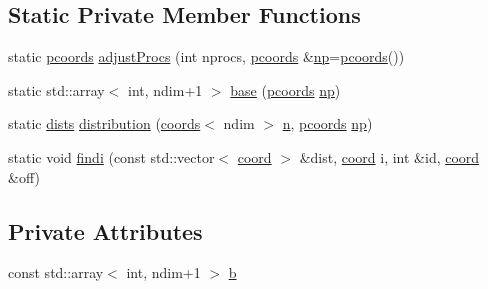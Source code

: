 \subsection*{Static Private Member Functions}
\begin{DoxyCompactItemize}
\item 
static \hyperlink{classshark_1_1ndim_1_1_domain_a9684ccd8af33cff7639c782290ac37ee}{pcoords} \hyperlink{classshark_1_1ndim_1_1_domain_a6d8aabbf8423bae3e392a4a87caf2185}{adjust\+Procs} (int nprocs, \hyperlink{classshark_1_1ndim_1_1_domain_a9684ccd8af33cff7639c782290ac37ee}{pcoords} \&\hyperlink{classshark_1_1ndim_1_1_domain_a1d15ab99cb54dcc456c5bba8699bcddf}{np}=\hyperlink{classshark_1_1ndim_1_1_domain_a9684ccd8af33cff7639c782290ac37ee}{pcoords}())
\item 
static std\+::array$<$ int, ndim+1 $>$ \hyperlink{classshark_1_1ndim_1_1_domain_a9335637df58667fdf13f6f861281c973}{base} (\hyperlink{classshark_1_1ndim_1_1_domain_a9684ccd8af33cff7639c782290ac37ee}{pcoords} \hyperlink{classshark_1_1ndim_1_1_domain_a1d15ab99cb54dcc456c5bba8699bcddf}{np})
\item 
static \hyperlink{classshark_1_1ndim_1_1_domain_a8d425ae958ccde33494fe1346307e991}{dists} \hyperlink{classshark_1_1ndim_1_1_domain_ad9cdf348ad0d1c8fe06965b3e9b3a5d0}{distribution} (\hyperlink{structshark_1_1ndim_1_1coords}{coords}$<$ ndim $>$ \hyperlink{classshark_1_1ndim_1_1_domain_ab942ffcf99c5ee0f2589c8b9104abcfd}{n}, \hyperlink{classshark_1_1ndim_1_1_domain_a9684ccd8af33cff7639c782290ac37ee}{pcoords} \hyperlink{classshark_1_1ndim_1_1_domain_a1d15ab99cb54dcc456c5bba8699bcddf}{np})
\item 
static void \hyperlink{classshark_1_1ndim_1_1_domain_a54d58b320fe6d558735b60753f30f7f4}{findi} (const std\+::vector$<$ \hyperlink{namespaceshark_a767a92d5dd82cb82266473bff42fa6d9}{coord} $>$ \&dist, \hyperlink{namespaceshark_a767a92d5dd82cb82266473bff42fa6d9}{coord} i, int \&id, \hyperlink{namespaceshark_a767a92d5dd82cb82266473bff42fa6d9}{coord} \&off)
\end{DoxyCompactItemize}
\subsection*{Private Attributes}
\begin{DoxyCompactItemize}
\item 
const std\+::array$<$ int, ndim+1 $>$ \hyperlink{classshark_1_1ndim_1_1_domain_a3b9ed7ea09cc2d90575a43f92cc4e105}{b}
\end{DoxyCompactItemize}



